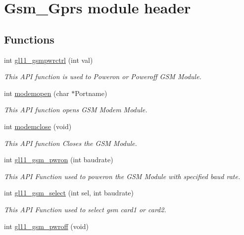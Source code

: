 \hypertarget{group__J}{\section{Gsm\+\_\+\+Gprs module header}
\label{group__J}
}
\subsection*{Functions}
\begin{DoxyCompactItemize}
\item 
int \hyperlink{group__J_ga6bc2c58aa861b09310bcb0b94162f8d3}{gl11\+\_\+gsmpwrctrl} (int val)
\begin{DoxyCompactList}\small\item\em This A\+P\+I function is used to Poweron or Poweroff G\+S\+M Module. \end{DoxyCompactList}\item 
int \hyperlink{group__J_ga09ea21cdfc6c18d07df547925d791dfe}{modemopen} (char $\ast$Portname)
\begin{DoxyCompactList}\small\item\em This A\+P\+I function opens G\+S\+M Modem Module. \end{DoxyCompactList}\item 
int \hyperlink{group__J_ga01d17c0d8a22f5b0f5b39358a51115ac}{modemclose} (void)
\begin{DoxyCompactList}\small\item\em This A\+P\+I function Closes the G\+S\+M Module. \end{DoxyCompactList}\item 
int \hyperlink{group__J_ga8abc3d3ae375a9a10614369d60addba4}{gl11\+\_\+gsm\+\_\+pwron} (int baudrate)
\begin{DoxyCompactList}\small\item\em This A\+P\+I Function used to poweron the G\+S\+M Module with specified baud rate. \end{DoxyCompactList}\item 
int \hyperlink{group__J_gae95624d1ed6841654b77eb47ac399fbf}{gl11\+\_\+gsm\+\_\+select} (int sel, int baudrate)
\begin{DoxyCompactList}\small\item\em This A\+P\+I Function used to select gsm card1 or card2. \end{DoxyCompactList}\item 
int \hyperlink{group__J_ga7adeabda2cc3bcbccbfd49b670ba0384}{gl11\+\_\+gsm\+\_\+pwroff} (void)

\end{DoxyCompactItemize}
